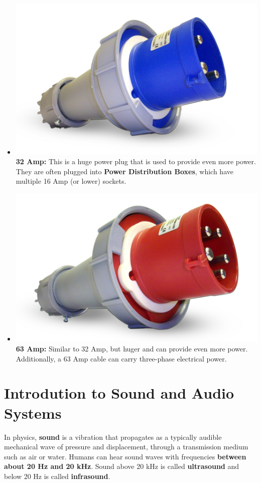 \documentclass[14pt,twocolumn]{extarticle} %
\begin{document}
\begin{itemize}
\item \includegraphics[scale=0.16]{32amp.jpg}\textbf{32 Amp:} This is a huge power plug that is used to provide even more power. They are often plugged into \textbf{Power Distribution Boxes}, which have multiple 16 Amp (or lower) sockets. 

\item \includegraphics[scale=0.16]{63amp.jpg}\textbf{63 Amp:} Similar to 32 Amp, but huger and can provide even more power. Additionally, a 63 Amp cable can carry three-phase electrical power. 

\end{itemize}


\section{Introdution to Sound and Audio Systems}
\label{intro-sound}
In physics, \textbf{sound} is a vibration that propagates as a typically audible mechanical wave of pressure and displacement, through a transmission medium such as air or water. Humans can hear sound waves with frequencies \textbf{between about 20 Hz and 20 kHz}. Sound above 20 kHz is called \textbf{ultrasound} and below 20 Hz is called \textbf{infrasound}.
\end{document}
